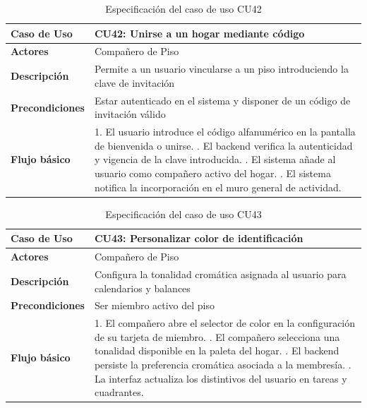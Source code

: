 \begin{table}[H]
\centering
\begin{tabular}{|p{3.2cm}|p{11.3cm}|}
\hline
\textbf{Caso de Uso} & \textbf{CU42: Unirse a un hogar mediante código} \\ \hline
\textbf{Actores} & Compañero de Piso \\ \hline
\textbf{Descripción} & Permite a un usuario vincularse a un piso introduciendo la clave de invitación \\ \hline
\textbf{Precondiciones} & Estar autenticado en el sistema y disponer de un código de invitación válido \\ \hline
\textbf{Flujo básico} & 
1. El usuario introduce el código alfanumérico en la pantalla de bienvenida o unirse. \newline
2. El backend verifica la autenticidad y vigencia de la clave introducida. \newline
3. El sistema añade al usuario como compañero activo del hogar. \newline
4. El sistema notifica la incorporación en el muro general de actividad. \\ \hline
\end{tabular}
\caption{Especificación del caso de uso CU42}
\label{tab:cu42}
\end{table}

\begin{table}[H]
\centering
\begin{tabular}{|p{3.2cm}|p{11.3cm}|}
\hline
\textbf{Caso de Uso} & \textbf{CU43: Personalizar color de identificación} \\ \hline
\textbf{Actores} & Compañero de Piso \\ \hline
\textbf{Descripción} & Configura la tonalidad cromática asignada al usuario para calendarios y balances \\ \hline
\textbf{Precondiciones} & Ser miembro activo del piso \\ \hline
\textbf{Flujo básico} & 
1. El compañero abre el selector de color en la configuración de su tarjeta de miembro. \newline
2. El compañero selecciona una tonalidad disponible en la paleta del hogar. \newline
3. El backend persiste la preferencia cromática asociada a la membresía. \newline
4. La interfaz actualiza los distintivos del usuario en tareas y cuadrantes. \\ \hline
\end{tabular}
\caption{Especificación del caso de uso CU43}
\label{tab:cu43}
\end{table}

